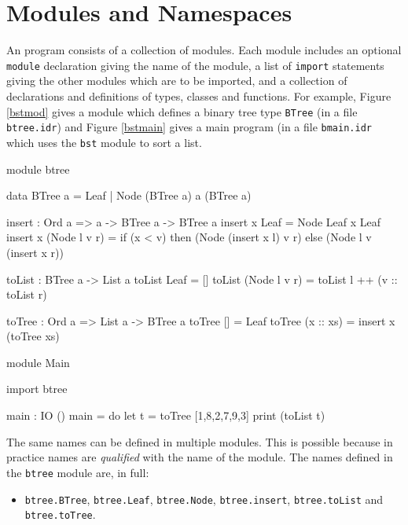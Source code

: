 \section{Modules and Namespaces}
\label{sect:namespaces}

An \Idris{} program consists of a collection of modules. Each module includes
an optional \texttt{module} declaration giving the name of the module, a
list of \texttt{import} statements giving the other modules which are to be imported,
and a collection of declarations and definitions of types, classes and functions.
For example, Figure \ref{bstmod} gives a module which defines a binary
tree type \texttt{BTree} (in a file \texttt{btree.idr}) and Figure
\ref{bstmain} gives a main program (in a file \texttt{bmain.idr} which uses the
\texttt{bst} module to sort a list.

\begin{code}[caption={Binary Tree module}, label=bstmod]
module btree

data BTree a = Leaf
             | Node (BTree a) a (BTree a)

insert : Ord a => a -> BTree a -> BTree a
insert x Leaf = Node Leaf x Leaf
insert x (Node l v r) = if (x < v) then (Node (insert x l) v r)
                                   else (Node l v (insert x r))

toList : BTree a -> List a
toList Leaf = []
toList (Node l v r) = toList l ++ (v :: toList r)

toTree : Ord a => List a -> BTree a
toTree [] = Leaf
toTree (x :: xs) = insert x (toTree xs)
\end{code}

\begin{code}[caption={Binary Tree main program},label=bstmain]
module Main

import btree

main : IO ()
main = do let t = toTree [1,8,2,7,9,3] 
          print (toList t)
\end{code}

\noindent
The same names can be defined in multiple modules. This is possible because in practice names
are \emph{qualified} with the name of the module. 
The names defined in the \texttt{btree} module are, in full:

\begin{itemize}
\item \texttt{btree.BTree}, \texttt{btree.Leaf}, \texttt{btree.Node}, \texttt{btree.insert},
\texttt{btree.toList} and \texttt{btree.toTree}.
\end{itemize}

